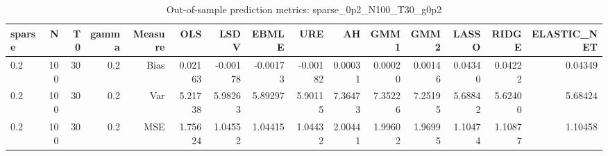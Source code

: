 \begin{table}[!htbp]\centering
\caption{Out-of-sample prediction metrics: sparse_0p2_N100_T30_g0p2}
\label{tab:table3_sparse_0p2_N100_T30_g0p2}
\begin{tabular}{lrrrrrrrrrrrrrr}
\hline
sparse & N & T0 & gamma & Measure & OLS & LSDV & EBMLE & URE & AH & GMM1 & GMM2 & LASSO & RIDGE & ELASTIC_NET \\
\hline
0.2 & 100 & 30 & 0.2 & Bias & 0.02163 & -0.00178 & -0.00173 & -0.00182 & 0.00031 & 0.00020 & 0.00146 & 0.04340 & 0.04222 & 0.04349 \\
0.2 & 100 & 30 & 0.2 & Var & 5.21738 & 5.98263 & 5.89297 & 5.90115 & 7.36473 & 7.35226 & 7.25195 & 5.68842 & 5.62400 & 5.68424 \\
0.2 & 100 & 30 & 0.2 & MSE & 1.75624 & 1.04552 & 1.04415 & 1.04432 & 2.00441 & 1.99602 & 1.96995 & 1.10474 & 1.10877 & 1.10458 \\
\hline
\end{tabular}
\end{table}

